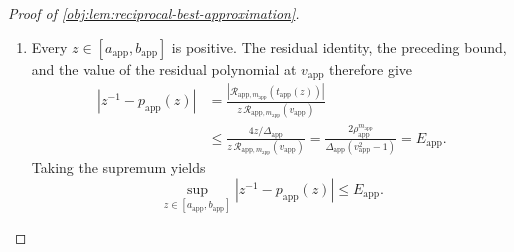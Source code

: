 \begin{proof}[Proof of \cref{obj:lem:reciprocal-best-approximation}]
\begin{enumerate}
\[
t_{\mathrm{app}}(z)
=\frac{a_{\mathrm{app}}+b_{\mathrm{app}}-2z}
{\Delta_{\mathrm{app}}}
\in[-1,1].
\]
Choose \(\theta_{\mathrm{app}}\in[0,\pi]\) with
\(\cos\theta_{\mathrm{app}}=t_{\mathrm{app}}(z)\).
The nonnegative squares in the two identities imply
\[
-2(v_{\mathrm{app}}-t_{\mathrm{app}}(z))
\le
\mathcal R_{\mathrm{app},m_{\mathrm{app}}}(t_{\mathrm{app}}(z))
\le
2(v_{\mathrm{app}}-t_{\mathrm{app}}(z)).
\]
Hence
\[
\left|
\mathcal R_{\mathrm{app},m_{\mathrm{app}}}(t_{\mathrm{app}}(z))
\right|
\le
2(v_{\mathrm{app}}-t_{\mathrm{app}}(z))
=\frac{4z}{\Delta_{\mathrm{app}}}.
\]

\item Every \(z\in[a_{\mathrm{app}},b_{\mathrm{app}}]\) is positive. The residual identity, the preceding bound, and the value of the residual polynomial at \(v_{\mathrm{app}}\) therefore give
\[
\begin{aligned}
|z^{-1}-p_{\mathrm{app}}(z)|
&=
\frac{
|\mathcal R_{\mathrm{app},m_{\mathrm{app}}}(t_{\mathrm{app}}(z))|
}{
z\,\mathcal R_{\mathrm{app},m_{\mathrm{app}}}(v_{\mathrm{app}})
}\\
&\le
\frac{4z/\Delta_{\mathrm{app}}}
{z\,\mathcal R_{\mathrm{app},m_{\mathrm{app}}}(v_{\mathrm{app}})}
=
\frac{2\rho_{\mathrm{app}}^{m_{\mathrm{app}}}}
{\Delta_{\mathrm{app}}(v_{\mathrm{app}}^2-1)}
=E_{\mathrm{app}}.
\end{aligned}
\]
Taking the supremum yields
\[
\sup_{z\in[a_{\mathrm{app}},b_{\mathrm{app}}]}
|z^{-1}-p_{\mathrm{app}}(z)|
\le E_{\mathrm{app}}.
\]


\end{enumerate}
\end{proof}
